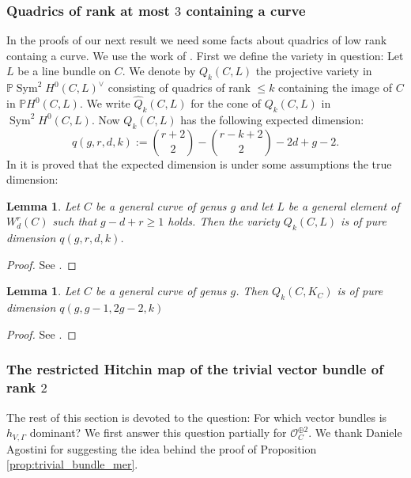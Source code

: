 \documentclass[12pt]{extarticle}
\newtheorem{lemma}[theorem]{Lemma}
\theoremstyle{definition}
\numberwithin{theorem}{section}
\newcommand{\PP}{\mathbb{P}}
\newcommand{\OO}{\mathcal{O}}
\newcommand{\op}{\operatorname}
\begin{document}
\subsubsection{Quadrics of rank at most $3$ containing a curve}
In the proofs of our next result we need some facts about quadrics of low rank containg a curve. We use the work of \cite{kadiklöylü}. First we define the variety in question: Let $L$ be a line bundle on $C$. We denote by $Q_k(C,L)$ the projective variety in $\PP\op{Sym}^2H^0(C,L)^\vee$ consisting of quadrics of rank $\leq k$ containing the image of $C$ in $\PP H^0(C,L)$. We write $\hat{Q}_k(C,L)$ for the cone of $Q_k(C,L)$ in $\op{Sym}^2H^0(C,L)$. Now $Q_k(C,L)$ has the following expected dimension:
\begin{equation*}
q(g,r,d,k) := \binom{r+2}{2}-\binom{r-k+2}{2}-2d+g-2.
\end{equation*}    
In \cite{kadiklöylü} it is proved that the expected dimension is under some assumptions the true dimension:
\begin{lemma}\label{lemma:quadrics}
Let $C$ be a general curve of genus $g$ and let $L$ be a general element of $W^r_d(C)$ such that $g-d+r\geq 1$ holds. Then the variety $Q_k(C,L)$ is of pure dimension $q(g,r,d,k)$.
\end{lemma}
\begin{proof}
See \cite[Theorem 1.1]{kadiklöylü}.
\end{proof}
\begin{lemma}\label{lemma:quadrics,canonical}
Let $C$ be a general curve of genus $g$. Then $Q_k(C,K_C)$ is of pure dimension ${q(g,g-1,2g-2,k)}$
\end{lemma}
\begin{proof}
See \cite[Lemma 2.1]{kadiklöylü}.
\end{proof}

\subsubsection{The restricted Hitchin map of the trivial vector bundle of rank $2$}

The rest of this section is devoted to the question: For which vector bundles is $h_{V,\Gamma}$ dominant? We first answer this question partially for $\OO_C^{\oplus 2}$. We thank Daniele Agostini for suggesting the idea behind the proof of Proposition \ref{prop:trivial_bundle_mer}. 
\end{document}
